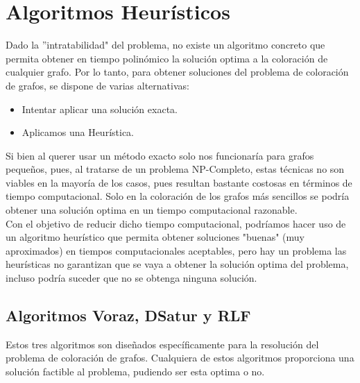 \documentclass[12pt]{report}
\begin{document}
\section{Algoritmos Heurísticos}
Dado la ''intratabilidad" del problema, no existe un algoritmo concreto que permita obtener en tiempo polinómico la solución optima a la coloración de cualquier grafo. Por lo tanto, para obtener soluciones del problema de coloración de grafos, se dispone de varias alternativas: \\
\begin{itemize}
\item Intentar aplicar una solución exacta.
\item Aplicamos una Heurística.
\end{itemize}
Si bien al querer usar un método exacto solo nos funcionaría para grafos pequeños, pues, al tratarse de un problema NP-Completo, estas técnicas no son viables en la mayoría de los casos, pues resultan bastante costosas en términos de tiempo computacional. Solo en la coloración de los grafos más sencillos se podría obtener una solución optima en un tiempo computacional razonable.\\
Con el objetivo de reducir dicho tiempo computacional, podríamos hacer uso de un algoritmo heurístico que permita obtener soluciones "buenas" (muy aproximados) en tiempos computacionales aceptables, pero hay un problema las heurísticas no garantizan que se vaya a obtener la solución optima del problema, incluso podría suceder que no se obtenga ninguna solución.\\

\subsection{Algoritmos Voraz, DSatur y RLF}
Estos tres algoritmos son diseñados específicamente para la resolución del problema de coloración de grafos. Cualquiera de estos algoritmos proporciona una solución factible al problema, pudiendo ser esta optima o no. \\
\end{document}
